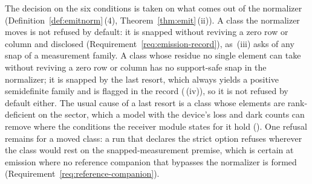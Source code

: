 
The decision on the six conditions is taken on what comes out of the
normalizer (Definition~\ref{def:emitnorm}\,(4), Theorem~\ref{thm:emit}\,(ii)).
A class the normalizer moves is not refused by default: it is snapped without
reviving a zero row or column and disclosed
(Requirement~\ref{req:emission-record}), as
\,(iii) asks of any snap of a
measurement family. A class whose residue no single element can take
without reviving a zero row or column has no support-safe snap in the
normalizer; it is snapped by the last resort, which always yields a positive
semidefinite family and is flagged in the record
(\,(iv)), so it is not refused by
default either. The usual cause of a last resort is a class whose elements
are rank-deficient on the sector, which a model with the device's loss and
dark counts can remove where the conditions the receiver module states for it
hold (). One refusal
remains for a moved class: a run that declares the strict option refuses
wherever the class would rest on the snapped-measurement premise, which is
certain at emission where no reference companion that bypasses the
normalizer is formed (Requirement~\ref{req:reference-companion}).

